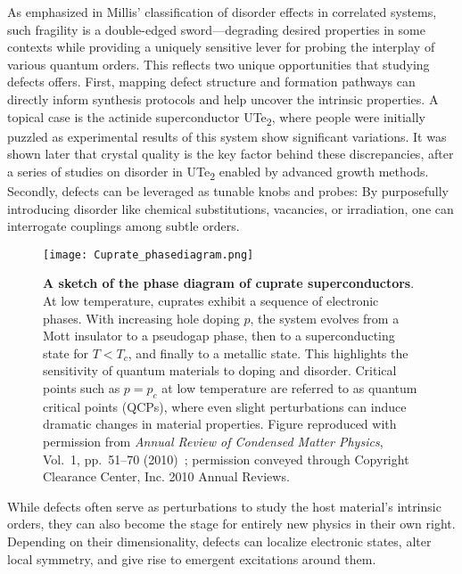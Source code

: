 As emphasized in Millis’ classification of disorder effects in correlated systems\cite{millisClassificationEffectsDisorder2003}, such fragility is a double-edged sword—degrading desired properties in some contexts while providing a uniquely sensitive lever for probing the interplay of various quantum orders. This reflects two unique opportunities that studying defects offers. First, mapping defect structure and formation pathways can directly inform synthesis protocols and help uncover the intrinsic properties. A topical case is the actinide superconductor UTe\textsubscript{2}, where people were initially puzzled as experimental results of this system show significant variations. It was shown later that crystal quality is the key factor behind these discrepancies, after a series of studies on disorder in UTe\textsubscript{2} enabled by advanced growth methods\cite{aishwaryaMeltingChargeDensity2024,xueAdvancesSingleCrystal2025}. Secondly, defects can be leveraged as tunable knobs and probes: By purposefully introducing disorder like chemical substitutions, vacancies, or irradiation, one can interrogate couplings among subtle orders\cite{fradkinIntertwinedOrdersPhysics2025,ohDisentanglingIntertwinedOrders2025}.   

\begin{figure} 
	\centering
	\texttt{[image: Cuprate\_phasediagram.png]}
	\caption[\textbf{A sketch of the phase diagram of cuprate superconductor}]{\textbf{A sketch of the phase diagram of cuprate superconductors}. At low temperature, cuprates exhibit a sequence of electronic phases. With increasing hole doping $p$, the system evolves from a Mott insulator to a pseudogap phase, then to a superconducting state for $T < T_c$, and finally to a metallic state. This highlights the sensitivity of quantum materials to doping and disorder. Critical points such as $p = p_c$ at low temperature are referred to as quantum critical points (QCPs), where even slight perturbations can induce dramatic changes in material properties. Figure reproduced with permission from \textit{Annual Review of Condensed Matter Physics}, Vol.~1, pp.~51--70 (2010)~\cite{tailleferScatteringPairingCuprate2010}; permission conveyed through Copyright Clearance Center, Inc. \textcopyright{} 2010 Annual Reviews.}

	\label{fig:cuprate_pd}
\end{figure}

While defects often serve as perturbations to study the host material’s intrinsic orders, they can also become the stage for entirely new physics in their own right. Depending on their dimensionality, defects can localize electronic states, alter local symmetry, and give rise to emergent excitations around them.

